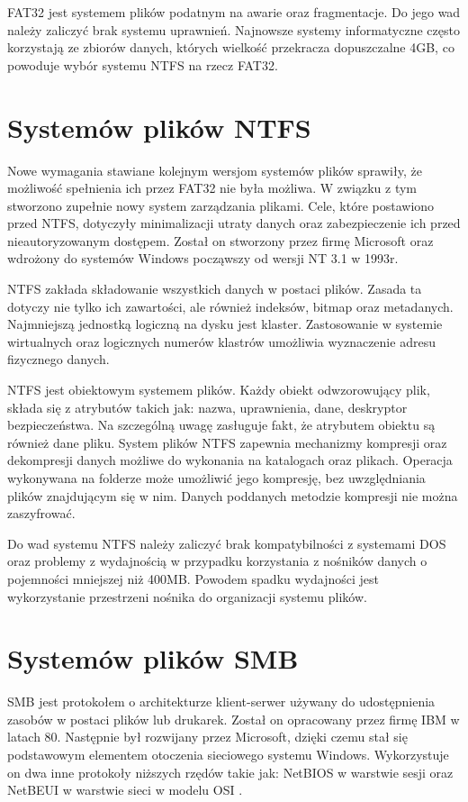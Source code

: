 FAT32 jest systemem plików podatnym na awarie oraz fragmentacje. Do jego wad należy zaliczyć brak systemu uprawnień. Najnowsze systemy informatyczne często korzystają ze zbiorów danych, których wielkość przekracza dopuszczalne 4GB, co powoduje wybór systemu NTFS na rzecz FAT32. 
\section{Systemów plików NTFS}
Nowe wymagania stawiane kolejnym wersjom systemów plików sprawiły, że możliwość spełnienia ich przez FAT32 nie była możliwa. W związku z tym stworzono zupełnie nowy system zarządzania plikami. Cele, które postawiono przed NTFS, dotyczyły minimalizacji utraty danych oraz zabezpieczenie ich przed nieautoryzowanym dostępem. Został on stworzony przez firmę Microsoft oraz wdrożony do systemów Windows począwszy od wersji NT 3.1 w 1993r.

NTFS zakłada składowanie wszystkich danych w postaci plików. Zasada ta dotyczy nie tylko ich zawartości, ale również indeksów, bitmap oraz metadanych. Najmniejszą jednostką logiczną na dysku jest klaster. Zastosowanie w systemie wirtualnych oraz logicznych numerów klastrów umożliwia wyznaczenie adresu fizycznego danych.

NTFS jest obiektowym systemem plików. Każdy obiekt odwzorowujący plik, składa się z atrybutów takich jak: nazwa, uprawnienia, dane, deskryptor bezpieczeństwa. Na szczególną uwagę zasługuje fakt, że atrybutem obiektu są również dane pliku. System plików NTFS zapewnia mechanizmy kompresji oraz dekompresji danych możliwe do wykonania na katalogach oraz plikach. Operacja wykonywana na folderze może umożliwić jego kompresję, bez uwzględniania plików znajdującym się w nim. Danych poddanych metodzie kompresji nie można zaszyfrować.

Do wad systemu NTFS należy zaliczyć brak kompatybilności z systemami DOS oraz problemy z wydajnością w przypadku korzystania z nośników danych o pojemności mniejszej niż 400MB. Powodem spadku wydajności jest wykorzystanie przestrzeni nośnika do organizacji systemu plików.


\section{Systemów plików SMB}
SMB\cite{SMB:limitation} jest protokołem o architekturze klient-serwer używany do udostępnienia zasobów w postaci plików lub drukarek. Został on opracowany przez firmę IBM w latach 80. Następnie był rozwijany przez Microsoft, dzięki czemu stał się podstawowym elementem otoczenia sieciowego systemu Windows. Wykorzystuje on dwa inne protokoły niższych rzędów takie jak: NetBIOS w warstwie sesji oraz NetBEUI w warstwie sieci w modelu OSI \cite{ISOOSI:limitation}.

